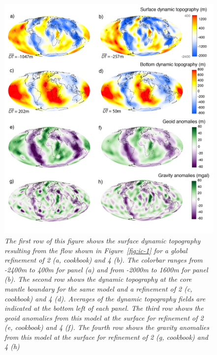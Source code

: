 \documentclass{article}
\begin{document}
\begin{figure}
  \includegraphics[width=\textwidth]{cookbooks/initial-condition-S20RTS/doc/Fig_cookbook_V4-02.png}
  \hfill
  \caption{\it The first row of this figure shows the surface dynamic topography resulting
  from the flow shown in Figure~\ref{fig:ic-1} for a global
  refinement of 2 (a, cookbook) and 4 (b). The colorbar ranges from -2400m to 400m for panel (a) and
  from -2000m to 1600m for panel (b). The second row shows the dynamic topography at
  the core mantle boundary for the same model and a refinement of 2 (c, cookbook) and 4 (d). Averages of the
  dynamic topography fields are indicated at the bottom left of each panel. The third row shows the
  geoid anomalies from this model at the surface for refinement of 2 (e, cookbook) and 4 (f).
  The fourth row shows the gravity anomalies from this model at the surface for refinement of 2
  (g, cookbook) and 4 (h)}
  \label{fig:ic-2}
\end{figure}








\end{document}
